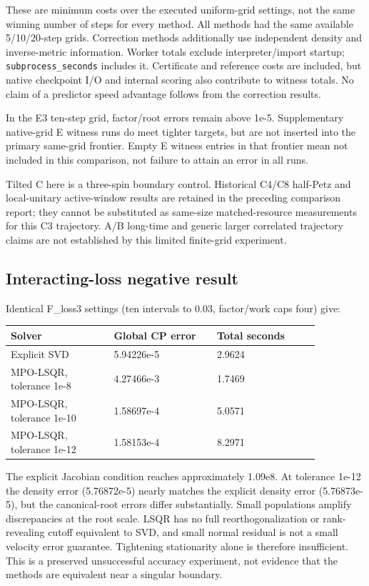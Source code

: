 \documentclass[10pt]{article}
\begin{document}
These are minimum costs over the executed uniform-grid settings, not the same
winning number of steps for every method. All methods had the same available
5/10/20-step grids. Correction methods additionally use independent density and
inverse-metric information. Worker totals exclude interpreter/import startup;
\texttt{subprocess\_seconds} includes it. Certificate and reference costs are included,
but native checkpoint I/O and internal scoring also contribute to witness totals.
No claim of a predictor speed advantage follows from the correction results.

In the E3 ten-step grid, factor/root errors remain above 1e-5. Supplementary
native-grid E witness runs do meet tighter targets, but are not inserted into
the primary same-grid frontier. Empty E witness entries in that frontier mean
not included in this comparison, not failure to attain an error in all runs.

Tilted C here is a three-spin boundary control. Historical C4/C8 half-Petz and
local-unitary active-window results are retained in the preceding comparison
report; they cannot be substituted as same-size matched-resource measurements
for this C3 trajectory. A/B long-time and generic larger correlated trajectory
claims are not established by this limited finite-grid experiment.

\subsection*{Interacting-loss negative result}

Identical F\_loss3 settings (ten intervals to 0.03, factor/work caps four) give:

\begingroup\small\setlength{\tabcolsep}{3pt}\begin{longtable}{p{0.28833333333333333\linewidth}p{0.28833333333333333\linewidth}p{0.28833333333333333\linewidth}}\toprule
Solver & Global CP error & Total seconds \\
\midrule\endhead
Explicit SVD & 5.94226e-5 & 2.9624 \\
MPO-LSQR, tolerance 1e-8 & 4.27466e-3 & 1.7469 \\
MPO-LSQR, tolerance 1e-10 & 1.58697e-4 & 5.0571 \\
MPO-LSQR, tolerance 1e-12 & 1.58153e-4 & 8.2971 \\
\bottomrule\end{longtable}\endgroup

The explicit Jacobian condition reaches approximately 1.09e8. At tolerance
1e-12 the density error (5.76872e-5) nearly matches the explicit density error
(5.76873e-5), but the canonical-root errors differ substantially. Small
populations amplify discrepancies at the root scale. LSQR has no full
reorthogonalization or rank-revealing cutoff equivalent to SVD, and small normal
residual is not a small velocity error guarantee. Tightening stationarity alone
is therefore insufficient. This is a preserved unsuccessful accuracy experiment,
not evidence that the methods are equivalent near a singular boundary.
\end{document}
